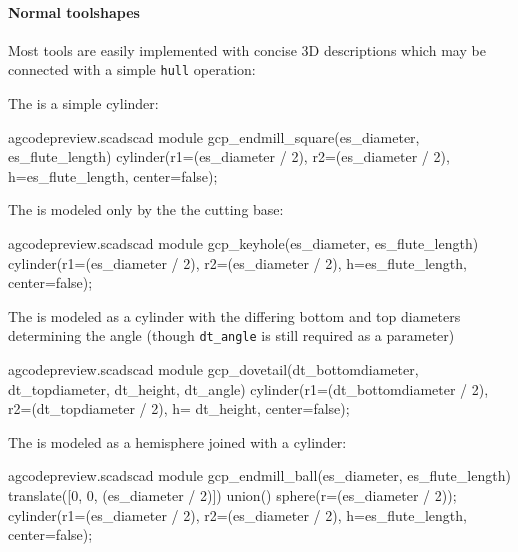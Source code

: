 \documentclass{ltxdoc}
\begin{document}
\paragraph{Normal toolshapes}
Most tools are easily implemented with concise 3D descriptions which may be connected with
a simple \texttt{hull} operation:

The  is a simple cylinder:
\lstset{firstnumber=\thegcpscad}
\begin{writecode}{a}{gcodepreview.scad}{scad}
module gcp_endmill_square(es_diameter, es_flute_length) {
  cylinder(r1=(es_diameter / 2), r2=(es_diameter / 2), h=es_flute_length, center=false);
}

\end{writecode}
\addtocounter{gcpscad}{4}

\begin{samepage}
The  is modeled only by the the cutting base:
\lstset{firstnumber=\thegcpscad}
\begin{writecode}{a}{gcodepreview.scad}{scad}
module gcp_keyhole(es_diameter, es_flute_length) {
  cylinder(r1=(es_diameter / 2), r2=(es_diameter / 2), h=es_flute_length, center=false);
}

\end{writecode}
\addtocounter{gcpscad}{4}
\end{samepage}

The  is modeled as a cylinder with the differing bottom and 
top diameters determining the angle (though \verb|dt_angle| is still required 
as a parameter)
\lstset{firstnumber=\thegcpscad}
\begin{writecode}{a}{gcodepreview.scad}{scad}
module gcp_dovetail(dt_bottomdiameter, dt_topdiameter, dt_height, dt_angle) {
  cylinder(r1=(dt_bottomdiameter / 2), r2=(dt_topdiameter / 2), h= dt_height, center=false);
}

\end{writecode}
\addtocounter{gcpscad}{4}

The  is modeled as a hemisphere joined with a cylinder:
\lstset{firstnumber=\thegcpscad}
\begin{writecode}{a}{gcodepreview.scad}{scad}
module gcp_endmill_ball(es_diameter, es_flute_length) {
  translate([0, 0, (es_diameter / 2)]){
    union(){
      sphere(r=(es_diameter / 2));
      cylinder(r1=(es_diameter / 2), r2=(es_diameter / 2), h=es_flute_length, center=false);
    }
  }
}

\end{writecode}
\addtocounter{gcpscad}{9}
\end{document}
